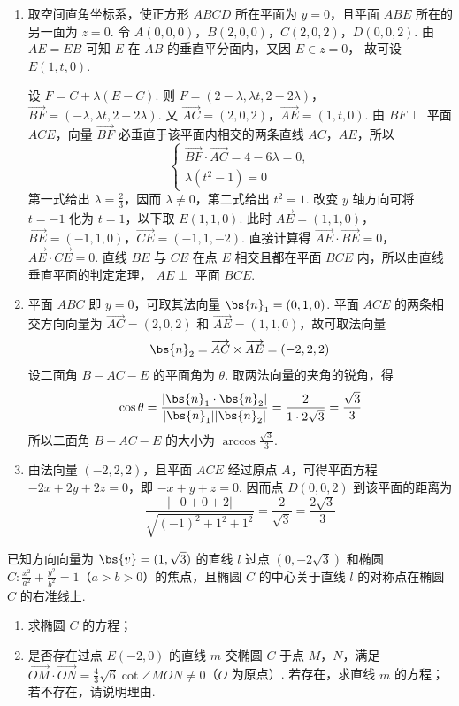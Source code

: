 \begin{solution}
\begin{enumerate}
\item 取空间直角坐标系，使正方形 \(ABCD\) 所在平面为 \(y=0\)，且平面 \(ABE\)
所在的另一面为 \(z=0\). 令
\(A(0,0,0)\)，\(B(2,0,0)\)，\(C(2,0,2)\)，\(D(0,0,2)\).
由 \(AE=EB\) 可知 \(E\) 在 \(AB\) 的垂直平分面内，又因 \(E\in z=0\)，
故可设 \(E(1,t,0)\).

设 \(F=C+\lambda(E-C)\). 则
\(F=(2-\lambda,\lambda t,2-2\lambda)\)，\(\overrightarrow{BF}=(-\lambda,\lambda t,2-2\lambda)\).
又
\(\overrightarrow{AC}=(2,0,2)\)，\(\overrightarrow{AE}=(1,t,0)\). 由
\(BF\perp\) 平面 \(ACE\)，向量 \(\overrightarrow{BF}\) 必垂直于该平面内相交的两条直线
\(AC\)，\(AE\)，所以
\[
\begin{cases}
\overrightarrow{BF}\cdot\overrightarrow{AC}=4-6\lambda=0,\\
\lambda(t^2-1)=0
\end{cases}
\]
第一式给出 \(\lambda=\frac{2}{3}\)，因而 \(\lambda\ne0\)，第二式给出
\(t^2=1\). 改变 \(y\) 轴方向可将 \(t=-1\) 化为 \(t=1\)，以下取
\(E(1,1,0)\). 此时
\(\overrightarrow{AE}=(1,1,0)\)，\(\overrightarrow{BE}=(-1,1,0)\)，\(\overrightarrow{CE}=(-1,1,-2)\).
直接计算得
\(\overrightarrow{AE}\cdot\overrightarrow{BE}=0\)，
\(\overrightarrow{AE}\cdot\overrightarrow{CE}=0\). 直线 \(BE\) 与 \(CE\) 在点
\(E\) 相交且都在平面 \(BCE\) 内，所以由直线垂直平面的判定定理，
\(AE\perp\) 平面 \(BCE\).
\item 平面 \(ABC\) 即 \(y=0\)，可取其法向量
\(\bs{n}_1=(0,1,0)\). 平面 \(ACE\) 的两条相交方向向量为
\(\overrightarrow{AC}=(2,0,2)\) 和 \(\overrightarrow{AE}=(1,1,0)\)，故可取法向量
\[
\bs{n}_2=\overrightarrow{AC}\times\overrightarrow{AE}=(-2,2,2)
\]
设二面角 \(B-AC-E\) 的平面角为 \(\theta\). 取两法向量的夹角的锐角，得
\[
\cos\theta
=\frac{|\bs{n}_1\cdot\bs{n}_2|}{|\bs{n}_1||\bs{n}_2|}
=\frac{2}{1\cdot2\sqrt{3}}
=\frac{\sqrt{3}}{3}
\]
所以二面角 \(B-AC-E\) 的大小为 \(\arccos\frac{\sqrt{3}}{3}\).
\item 由法向量 \((-2,2,2)\)，且平面 \(ACE\) 经过原点 \(A\)，可得平面方程
\(-2x+2y+2z=0\)，即 \(-x+y+z=0\). 因而点 \(D(0,0,2)\) 到该平面的距离为
\[
\frac{\lvert-0+0+2\rvert}{\sqrt{(-1)^2+1^2+1^2}}
=\frac{2}{\sqrt{3}}
=\frac{2\sqrt{3}}{3}
\]
\end{enumerate}
\end{solution}

\begin{problem}
已知方向向量为 \(\bs{v} = (1, \sqrt{3})\) 的直线 \(l\) 过点 \((0, -2\sqrt{3})\) 和椭圆 \(C: \frac{x^2}{a^2} + \frac{y^2}{b^2} = 1\)（\(a > b > 0\)）的焦点，且椭圆 \(C\) 的中心关于直线 \(l\) 的对称点在椭圆 \(C\) 的右准线上.

\begin{enumerate}
\item 求椭圆 \(C\) 的方程；
\item 是否存在过点 \(E(-2,0)\) 的直线 \(m\) 交椭圆 \(C\) 于点 \(M\)，\(N\)，满足 \(\overrightarrow{OM} \cdot \overrightarrow{ON} = \frac{4}{3}\sqrt{6}\cot \angle MON \neq 0\)（\(O\) 为原点）. 若存在，求直线 \(m\) 的方程；若不存在，请说明理由.
\end{enumerate}

\end{problem}

